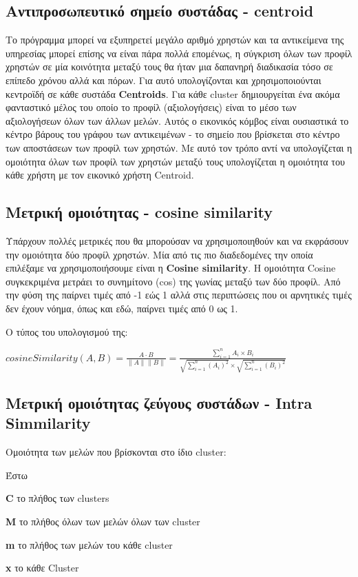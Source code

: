 \subsection{Αντιπροσωπευτικό σημείο συστάδας - centroid}
\noindent
Το πρόγραμμα μπορεί να εξυπηρετεί μεγάλο αριθμό χρηστών και τα αντικείμενα της υπηρεσίας μπορεί επίσης να είναι πάρα πολλά επομένως, η σύγκριση όλων των προφίλ χρηστών
σε μία κοινότητα μεταξύ τους θα ήταν μια δαπανηρή διαδικασία τόσο σε επίπεδο χρόνου αλλά και πόρων. 
Για αυτό υπολογίζονται και χρησιμοποιούνται κεντροϊδή σε κάθε συστάδα \textbf{Centroids}.
Για κάθε cluster δημιουργείται ένα ακόμα φανταστικό μέλος του οποίο το προφίλ (αξιολογήσεις) είναι το μέσο των αξιολογήσεων όλων των άλλων μελών. 
Αυτός ο εικονικός κόμβος είναι ουσιαστικά το κέντρο βάρους του γράφου των αντικειμένων - το σημείο που βρίσκεται στο κέντρο των αποστάσεων των προφίλ των χρηστών.
Με αυτό τον τρόπο αντί να υπολογίζεται η ομοιότητα όλων των προφίλ των χρηστών μεταξύ τους υπολογίζεται η ομοιότητα του κάθε χρήστη με τον εικονικό χρήστη Centroid.

\subsection{Μετρική ομοιότητας - cosine similarity}
\noindent
Υπάρχουν πολλές μετρικές που θα μπορούσαν να χρησιμοποιηθούν και να εκφράσουν την ομοιότητα δύο προφίλ χρηστών. 
Μία από τις πιο διαδεδομένες την οποία επιλέξαμε να χρησιμοποιήσουμε είναι η \textbf{Cosine similarity}. 
Η ομοιότητα Cosine συγκεκριμένα μετράει το συνημίτονο (cos) της γωνίας μεταξύ των δύο προφίλ.
Από την φύση της παίρνει τιμές από -1 εώς 1 αλλά στις περιπτώσεις που οι αρνητικές τιμές δεν έχουν νόημα, όπως και εδώ, παίρνει τιμές από 0 ως 1.

Ο τύπος του υπολογισμού της:

$ cosineSimilarity(A,B) = \frac{A \cdot B}{\|A\|\|B\|} = \frac{\sum\limits_{i=1}^n A_i \times B_i}{\sqrt{\sum\limits_{i=1}^n (A_i)^2} \times \sqrt{\sum\limits_{i=1}^n (B_i)^2}} $

\subsection{Μετρική ομοιότητας ζεύγους συστάδων - Intra Simmilarity}
\noindent
Ομοιότητα των μελών που βρίσκονται στο ίδιο cluster:

Έστω
\begin{description}
\item \textbf{C} το πλήθος των clusters  
\item \textbf{M} το πλήθος όλων των μελών όλων των cluster
\item \textbf{m} το πλήθος των μελών του κάθε cluster
\item \textbf{x} το κάθε Cluster
\end{description} 


